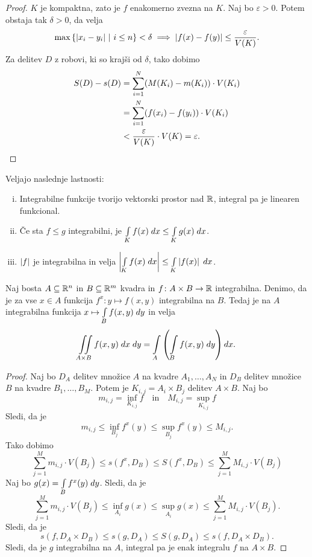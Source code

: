 \begin{proof}
$K$ je kompaktna, zato je $f$ enakomerno zvezna na $K$. Naj bo
$\varepsilon > 0$. Potem obstaja tak $\delta > 0$, da velja
\[
\max \left\{\left\lvert x_i - y_i\right\rvert~\middle\vert~i \leq n\right\} < \delta \implies
\left\lvert f(x) - f(y)\right\rvert \leq \frac{\varepsilon}{V(K)}.
\]
Za delitev $D$ z robovi, ki so krajši od $\delta$, tako dobimo
\begin{align*}
S(D) - s(D) &= \sum_{i=1}^N (M(K_i) - m(K_i)) \cdot V(K_i)
\\
&= \sum_{i=1}^N (f(x_i) - f(y_i)) \cdot V(K_i)
\\
&< \frac{\varepsilon}{V(K)} \cdot V(K) = \varepsilon. \qedhere
\end{align*}
\end{proof}

\begin{trditev}
Veljajo naslednje lastnosti:

\begin{enumerate}[i)]
\item Integrabilne funkcije tvorijo vektorski prostor nad $\mathbb{R}$,
integral pa je linearen funkcional.
\item Če sta $f \leq g$ integrabilni, je
$\int\limits_K f(x)\;dx \leq \int\limits_K g(x)\;dx$.
\item $\left\lvert f\right\rvert$ je integrabilna in velja
$\left\lvert \int\limits_K f(x)\;dx\right\rvert \leq \int\limits_K \left\lvert f(x)\right\rvert\;dx$.
\end{enumerate}
\end{trditev}

\obvs

\begin{izrek}[Fubini]
Naj bosta $A \subseteq \mathbb{R}^n$ in $B \subseteq \mathbb{R}^m$ kvadra in
$f \colon A \times B \to \mathbb{R}$ integrabilna. Denimo, da je za vse
$x \in A$ funkcija $f^x \colon y \mapsto f(x,y)$ integrabilna na
$B$. Tedaj je na $A$ integrabilna funkcija
$x \mapsto \int\limits_B f(x,y)\;dy$ in velja
\[
\iint\limits_{A \times B} f(x,y)\;dx\;dy =
\int\limits_A \left(\int\limits_B f(x,y)\;dy\right) dx.
\]
\end{izrek}


\begin{proof}
Naj bo $D_A$ delitev množice $A$ na kvadre $A_1,\dots,A_N$ in $D_B$
delitev množice $B$ na kvadre $B_1,\dots,B_M$. Potem je
$K_{i,j} = A_i \times B_j$ delitev $A \times B$. Naj bo
\[
m_{i,j} = \inf_{K_{i,j}} f
\quad \text{in} \quad
M_{i,j} = \sup_{K_{i,j}} f
\]
Sledi, da je
\[
m_{i,j} \leq \inf_{B_j} f^x(y) \leq \sup_{B_j} f^x(y) \leq M_{i,j}.
\]
Tako dobimo
\[
\sum_{j=1}^M m_{i,j} \cdot V(B_j) \leq
s(f^x,D_B) \leq
S(f^x,D_B) \leq
\sum_{j=1}^M M_{i,j} \cdot V(B_j)
\]
Naj bo $g(x) = \int\limits_B f^x(y)\;dy$. Sledi, da je
\[
\sum_{j=1}^M m_{i,j} \cdot V(B_j) \leq
\inf_{A_i} g(x) \leq
\sup_{A_i} g(x) \leq
\sum_{j=1}^M M_{i,j} \cdot V(B_j).
\]
Sledi, da je
\[
s(f,D_A \times D_B) \leq
s(g,D_A) \leq
S(g,D_A) \leq
s(f,D_A \times D_B).
\]
Sledi, da je $g$ integrabilna na $A$, integral pa je enak integralu
$f$ na $A \times B$.
\end{proof}

